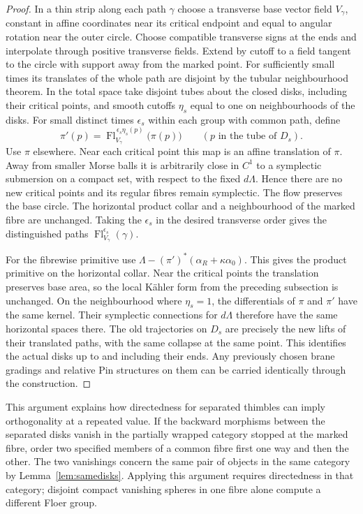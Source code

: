 \begin{proof}
In a thin strip along each path $\gamma$ choose a transverse base vector field $V_\gamma$, constant in affine coordinates near its critical endpoint and equal to angular rotation near the outer circle. Choose compatible transverse signs at the ends and interpolate through positive transverse fields. Extend by cutoff to a field tangent to the circle with support away from the marked point. For sufficiently small times its translates of the whole path are disjoint by the tubular neighbourhood theorem. In the total space take disjoint tubes about the closed disks, including their critical points, and smooth cutoffs $\eta_s$ equal to one on neighbourhoods of the disks. For small distinct times $\epsilon_s$ within each group with common path, define
\[
             \pi'(p)=\operatorname{Fl}^{\,\epsilon_s\eta_s(p)}_{V_\gamma}
                                  \bigl(\pi(p)\bigr)
             \qquad (p\text{ in the tube of }D_s).
\]
Use $\pi$ elsewhere. Near each critical point this map is an affine translation of $\pi$. Away from smaller Morse balls it is arbitrarily close in $C^1$ to a symplectic submersion on a compact set, with respect to the fixed $d\Lambda$. Hence there are no new critical points and its regular fibres remain symplectic. The flow preserves the base circle. The horizontal product collar and a neighbourhood of the marked fibre are unchanged. Taking the $\epsilon_s$ in the desired transverse order gives the distinguished paths $\operatorname{Fl}_{V_\gamma}^{\epsilon_s}(\gamma)$.

For the fibrewise primitive use $\Lambda-(\pi')^*(\alpha_R+\kappa\alpha_0)$. This gives the product primitive on the horizontal collar. Near the critical points the translation preserves base area, so the local Kähler form from the preceding subsection is unchanged. On the neighbourhood where $\eta_s=1$, the differentials of $\pi$ and $\pi'$ have the same kernel. Their symplectic connections for $d\Lambda$ therefore have the same horizontal spaces there. The old trajectories on $D_s$ are precisely the new lifts of their translated paths, with the same collapse at the same point. This identifies the actual disks up to and including their ends. Any previously chosen brane gradings and relative Pin structures on them can be carried identically through the construction.
\end{proof}

This argument explains how directedness for separated thimbles can imply orthogonality at a repeated value. If the backward morphisms between the separated disks vanish in the partially wrapped category stopped at the marked fibre, order two specified members of a common fibre first one way and then the other. The two vanishings concern the same pair of objects in the same category by Lemma~\ref{lem:samedisks}. Applying this argument requires directedness in that category; disjoint compact vanishing spheres in one fibre alone compute a different Floer group.
